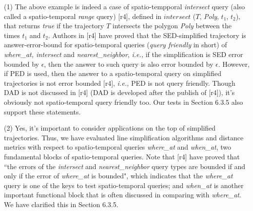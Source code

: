 \documentclass{letter}
\newcommand{\ie}{\emph{i.e.,}\xspace}
\begin{document}
{(1) The above example is indeed a case of spatio-tempporal \emph{intersect} query (also called a spatio-temporal \emph{range} query) [r4], defined in $intersect$ ($T$, \emph{Poly}, $t_1$, $t_2$), that returns \emph{true} if the trajectory $T$ intersects the polygon \emph{Poly} between the times $t_1$ and $t_2$. Authors in [r4] have proved that the SED-simplified trajectory is answer-error-bound for spatio-temporal queries (\emph{query friendly} in short) of \emph{where\_at, intersect} and \emph{nearest\_neighbor}, \ie if the simplification is SED error bounded by $\epsilon$, then the answer to such query is also error bounded by $\epsilon$.
However, if PED is used, then the answer to a spatio-temporal query on simplified trajectories is not error bounded [r4], \ie PED is not query friendly. Though DAD is not discussed in [r4] (DAD is developed after the publish of [r4]), it's obviously not spatio-temporal query friendly too. Our tests in Section 6.3.5 also support these statements.

(2) Yes, it's important to consider applications on the top of simplified trajectories. Thus, we have evaluated line simplification algorithms and distance metrics with respect to spatio-temporal queries \emph{where\_at} and \emph{when\_at}, two fundamental blocks of spatio-temporal queries. Note that [r4] have proved that ``the errors of the \emph{intersect} and \emph{nearest\_neighbor} query types are bounded if and only if the error of \emph{where\_at} is bounded", which indicates that the \emph{where\_at} query is one of the keys to test spatio-temporal queries; and \emph{when\_at} is another important functional block that is often discussed in comparing with \emph{where\_at}.
We have clarified this in Section 6.3.5.

}
\end{document}
